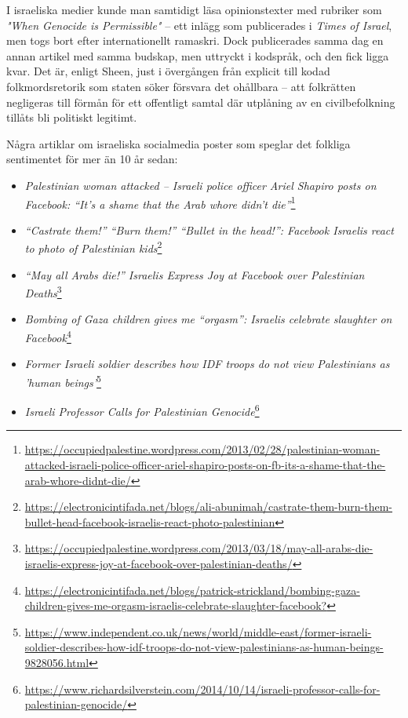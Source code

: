 I israeliska medier kunde man samtidigt läsa opinionstexter med rubriker som \textit{"When Genocide is
Permissible"} – ett inlägg som publicerades i \textit{Times of Israel}, men togs bort efter internationellt ramaskri.
Dock publicerades samma dag en annan artikel med samma budskap, men uttryckt i kodspråk, och den fick ligga
kvar. Det är, enligt Sheen, just i övergången från explicit till kodad folkmordsretorik som staten söker
försvara det ohållbara – att folkrätten negligeras till förmån för ett offentligt samtal där utplåning av en
civilbefolkning tillåts bli politiskt legitimt.

Några artiklar om israeliska socialmedia poster som speglar det folkliga sentimentet för mer än 10 år sedan:
\begin{itemize}
\item  \textit{Palestinian woman attacked – Israeli police officer Ariel Shapiro posts on Facebook: “It’s a shame that the Arab whore didn’t die”}\footnote{\url{https://occupiedpalestine.wordpress.com/2013/02/28/palestinian-woman-attacked-israeli-police-officer-ariel-shapiro-posts-on-fb-its-a-shame-that-the-arab-whore-didnt-die/}}

\item \textit{“Castrate them!” “Burn them!” “Bullet in the head!”: Facebook Israelis react to photo of Palestinian kids}\footnote{\url{https://electronicintifada.net/blogs/ali-abunimah/castrate-them-burn-them-bullet-head-facebook-israelis-react-photo-palestinian}}

\item \textit{“May all Arabs die!” Israelis Express Joy at Facebook over Palestinian Deaths}\footnote{\url{https://occupiedpalestine.wordpress.com/2013/03/18/may-all-arabs-die-israelis-express-joy-at-facebook-over-palestinian-deaths/}}

\item \textit{Bombing of Gaza children gives me “orgasm”: Israelis celebrate slaughter on Facebook}\footnote{\url{https://electronicintifada.net/blogs/patrick-strickland/bombing-gaza-children-gives-me-orgasm-israelis-celebrate-slaughter-facebook?}}

\item \textit{Former Israeli soldier describes how IDF troops do not view Palestinians as 'human beings'}\footnote{\url{https://www.independent.co.uk/news/world/middle-east/former-israeli-soldier-describes-how-idf-troops-do-not-view-palestinians-as-human-beings-9828056.html}}

\item \textit{Israeli Professor Calls for Palestinian Genocide}\footnote{\url{https://www.richardsilverstein.com/2014/10/14/israeli-professor-calls-for-palestinian-genocide/}}


\end{itemize}
